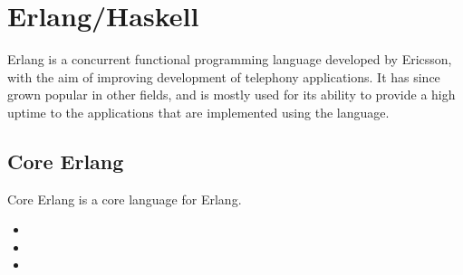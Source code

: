 \section{Erlang/Haskell}



Erlang is a concurrent functional programming language developed by Ericsson, with the aim of improving
development of telephony applications. It has since grown popular in other fields, and is mostly used
for its ability to provide a high uptime to the applications that are implemented using the language.

\subsection{Core Erlang}
Core Erlang \cite{CoreErlangIntro} is a core language for Erlang.
\begin{itemize}
  \item {}
  \item {}
  \item {}
\end{itemize}
